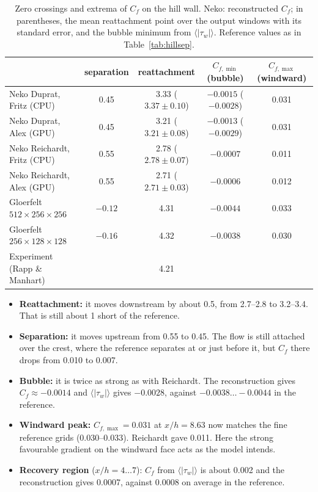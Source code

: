 \documentclass[11pt,a4paper]{article}
\begin{document}
\begin{table}[htbp]
\centering
\footnotesize
\setlength{\tabcolsep}{4pt}
\caption{Zero crossings and extrema of $C_f$ on the hill wall. Neko:
reconstructed $C_f$; in parentheses, the mean reattachment point over the
output windows with its standard error, and the bubble minimum from
$\langle|\tau_w|\rangle$. Reference values as in Table~\ref{tab:hillsep}.}
\label{tab:hilldupsep}
\begin{tabular}{@{}lcccc@{}}
\toprule
 & separation & reattachment & $C_{f,\min}$ (bubble) & $C_{f,\max}$ (windward) \\
\midrule
Neko Duprat, Fritz (CPU) & 0.45 & 3.33 ($3.37 \pm 0.10$) & $-0.0015$ ($-0.0028$) & 0.031 \\
Neko Duprat, Alex (GPU) & 0.45 & 3.21 ($3.21 \pm 0.08$) & $-0.0013$ ($-0.0029$) & 0.031 \\
Neko Reichardt, Fritz (CPU) & 0.55 & 2.78 ($2.78 \pm 0.07$) & $-0.0007$ & 0.011 \\
Neko Reichardt, Alex (GPU) & 0.55 & 2.71 ($2.71 \pm 0.03$) & $-0.0006$ & 0.012 \\
Gloerfelt $512\times256\times256$ & $-0.12$ & 4.31 & $-0.0044$ & 0.033 \\
Gloerfelt $256\times128\times128$ & $-0.16$ & 4.32 & $-0.0038$ & 0.030 \\
Experiment (Rapp \& Manhart) & & 4.21 & & \\
\bottomrule
\end{tabular}
\end{table}

\begin{itemize}
  \item \textbf{Reattachment:} it moves downstream by about 0.5, from
    2.7--2.8 to 3.2--3.4. That is still about 1 short of the reference.
  \item \textbf{Separation:} it moves upstream from 0.55 to 0.45. The flow
    is still attached over the crest, where the reference separates at or
    just before it, but $C_f$ there drops from 0.010 to 0.007.
  \item \textbf{Bubble:} it is twice as strong as with Reichardt. The
    reconstruction gives $C_f \approx -0.0014$ and $\langle|\tau_w|\rangle$
    gives $-0.0028$, against $-0.0038\ldots-0.0044$ in the reference.
  \item \textbf{Windward peak:} $C_{f,\max} = 0.031$ at $x/h = 8.63$ now
    matches the fine reference grids (0.030--0.033). Reichardt gave 0.011.
    Here the strong favourable gradient on the windward face acts as the
    model intends.
  \item \textbf{Recovery region} ($x/h = 4\ldots7$): $C_f$ from
    $\langle|\tau_w|\rangle$ is about 0.002 and the reconstruction gives
    0.0007, against 0.0008 on average in the reference.
\end{itemize}
\end{document}
